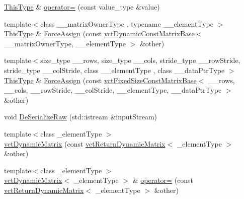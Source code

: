 \begin{DoxyCompactItemize}
\item 
\hyperlink{classvct_dynamic_const_matrix_base_ac4ff48cbe4d9de3fdef5a02447ffb9db}{This\-Type} \& \hyperlink{classvct_dynamic_matrix_ae454cb17930864f98478bab90deea523}{operator=} (const value\-\_\-type \&value)
\item 
{\footnotesize template$<$class \-\_\-\-\_\-matrix\-Owner\-Type , typename \-\_\-\-\_\-element\-Type $>$ }\\\hyperlink{classvct_dynamic_const_matrix_base_ac4ff48cbe4d9de3fdef5a02447ffb9db}{This\-Type} \& \hyperlink{classvct_dynamic_matrix_a54c7ee11cd1cc092850b9c38e248a72d}{Force\-Assign} (const \hyperlink{classvct_dynamic_const_matrix_base}{vct\-Dynamic\-Const\-Matrix\-Base}$<$ \-\_\-\-\_\-matrix\-Owner\-Type, \-\_\-\-\_\-element\-Type $>$ \&other)
\item 
{\footnotesize template$<$size\-\_\-type \-\_\-\-\_\-rows, size\-\_\-type \-\_\-\-\_\-cols, stride\-\_\-type \-\_\-\-\_\-row\-Stride, stride\-\_\-type \-\_\-\-\_\-col\-Stride, class \-\_\-\-\_\-element\-Type , class \-\_\-\-\_\-data\-Ptr\-Type $>$ }\\\hyperlink{classvct_dynamic_const_matrix_base_ac4ff48cbe4d9de3fdef5a02447ffb9db}{This\-Type} \& \hyperlink{classvct_dynamic_matrix_abafc3cf32fa44ce0db81b58c4c5756f5}{Force\-Assign} (const \hyperlink{classvct_fixed_size_const_matrix_base}{vct\-Fixed\-Size\-Const\-Matrix\-Base}$<$ \-\_\-\-\_\-rows, \-\_\-\-\_\-cols, \-\_\-\-\_\-row\-Stride, \-\_\-\-\_\-col\-Stride, \-\_\-\-\_\-element\-Type, \-\_\-\-\_\-data\-Ptr\-Type $>$ \&other)
\item 
void \hyperlink{classvct_dynamic_matrix_a29ee09b8c6539a5cc0aebb8f8fcb370a}{De\-Serialize\-Raw} (std\-::istream \&input\-Stream)
\item 
{\footnotesize template$<$class \-\_\-element\-Type $>$ }\\\hyperlink{classvct_dynamic_matrix_aebecf9456fca906714dcc7acdefdf217}{vct\-Dynamic\-Matrix} (const \hyperlink{classvct_return_dynamic_matrix}{vct\-Return\-Dynamic\-Matrix}$<$ \-\_\-element\-Type $>$ \&other)
\item 
{\footnotesize template$<$class \-\_\-element\-Type $>$ }\\\hyperlink{classvct_dynamic_matrix}{vct\-Dynamic\-Matrix}$<$ \-\_\-element\-Type $>$ \& \hyperlink{classvct_dynamic_matrix_aeb7ddcac2f89742b03220af2fa259436}{operator=} (const \hyperlink{classvct_return_dynamic_matrix}{vct\-Return\-Dynamic\-Matrix}$<$ \-\_\-element\-Type $>$ \&other)
\end{DoxyCompactItemize}
{\bf }\par
